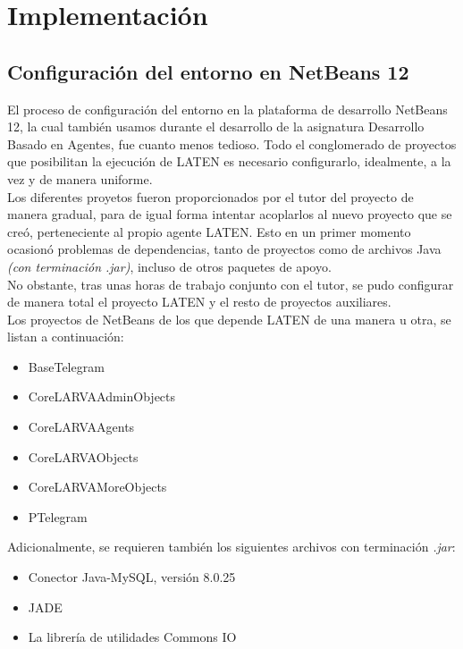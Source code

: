 \chapter{Implementación}

\section{Configuración del entorno en NetBeans 12}

El proceso de configuración del entorno en la plataforma de desarrollo NetBeans 12, la cual también usamos durante el desarrollo de la asignatura Desarrollo Basado en Agentes, fue cuanto menos tedioso. Todo el conglomerado de proyectos que posibilitan la ejecución de LATEN es necesario configurarlo, idealmente, a la vez y de manera uniforme.\\

Los diferentes proyetos fueron proporcionados por el tutor del proyecto de manera gradual, para de igual forma intentar acoplarlos al nuevo proyecto que se creó, perteneciente al propio agente LATEN. Esto en un primer momento ocasionó problemas de dependencias, tanto de proyectos como de archivos Java \textit{(con terminación .jar)}, incluso de otros paquetes de apoyo.\\

No obstante, tras unas horas de trabajo conjunto con el tutor, se pudo configurar de manera total el proyecto LATEN y el resto de proyectos auxiliares.\\

Los proyectos de NetBeans de los que depende LATEN de una manera u otra, se listan a continuación:

\begin{itemize}
	\item BaseTelegram
	\item CoreLARVAAdminObjects
	\item CoreLARVAAgents
	\item CoreLARVAObjects
	\item CoreLARVAMoreObjects
	\item PTelegram
\end{itemize}

Adicionalmente, se requieren también los siguientes archivos con terminación \textit{.jar}:

\begin{itemize}
	\item Conector Java-MySQL, versión 8.0.25
	\item JADE
	\item La librería de utilidades Commons IO
\end{itemize}

